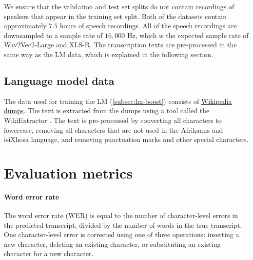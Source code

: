 We ensure that the validation and test set splits do not contain recordings of speakers that appear in the training set split.
Both of the datasets contain approximately $7.5$ hours of speech recordings.
All of the speech recordings are downsampled to a sample rate of $16,000$ Hz, which is the expected sample rate of Wav2Vec2-Large and XLS-R.
The transcription texts are pre-processed in the same way as the LM data, which is explained in the following section.

\subsection{Language model data}
The data used for training the LM (\ref{subsec:lm-boost}) consists of \href{https://dumps.wikimedia.org/}{Wikipedia dumps}.
The text is extracted from the dumps using a tool called the WikiExtractor \cite{Wikiextractor2015}.
The text is pre-processed by converting all characters to lowercase, removing all characters that are not used in the Afrikaans
and isiXhosa language, and removing punctuation marks and other special characters.

\section{Evaluation metrics}

\paragraph*{Word error rate} \label{subsec:wer}
The word error rate (WER) is equal to the number of character-level errors in the predicted transcript, 
divided by the number of words in the true transcript. One character-level error is corrected using one of three operations:
inserting a new character, deleting an existing character, or substituting an existing character for a new character.
